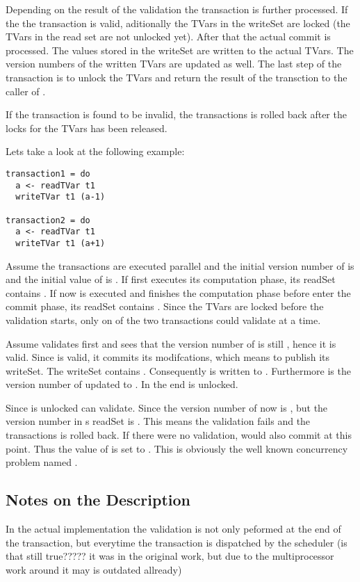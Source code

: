Depending on the result of the validation the transaction is further processed. If the the transaction is valid, aditionally the
TVars in the writeSet are locked (the TVars in the read set are not unlocked yet). After that the actual commit is processed. 
The values stored in the writeSet are written to the actual TVars. The version numbers of the written TVars are updated as well.
The last step of the transaction is to unlock the TVars and return the result of the transction to the caller of .

If the transaction is found to be invalid, the transactions is rolled back after the locks for the TVars has been released.


Lets take a look at the following example:
\begin{lstlisting}
transaction1 = do 
  a <- readTVar t1
  writeTVar t1 (a-1)
  
transaction2 = do 
  a <- readTVar t1
  writeTVar t1 (a+1)
\end{lstlisting}
Assume the transactions are executed parallel and the initial version number of  is  and the initial value of  is .
If  first executes its computation phase, its readSet contains . 
If now  is executed and finishes the computation phase before  enter the commit phase,
its readSet contains . Since the TVars are locked before the validation starts, only on 
of the two transactions could validate at a time. 

Assume  validates first and sees that the version number of 
is still , hence it is valid. Since  is valid, it commits its modifcations, which means to publish its writeSet.
The writeSet contains .  Consequently  is written to . Furthermore is the version number of  updated
to . In the end  is unlocked. 

Since  is unlocked  can validate. Since the version number of  now is , but the version
number in s readSet is . This means the validation fails and the transactions is rolled back. If there were 
no validation,  would also commit at this point. Thus the value of  is set to . This is obviously
the well known concurrency problem named . 


\subsection{Notes on the Description}
In the actual implementation the validation is not only peformed at the end of the transaction, but everytime the transaction is 
dispatched by the scheduler (is that still true????? it was in the original work, but due to the multiprocessor work around it may
is outdated allready)


